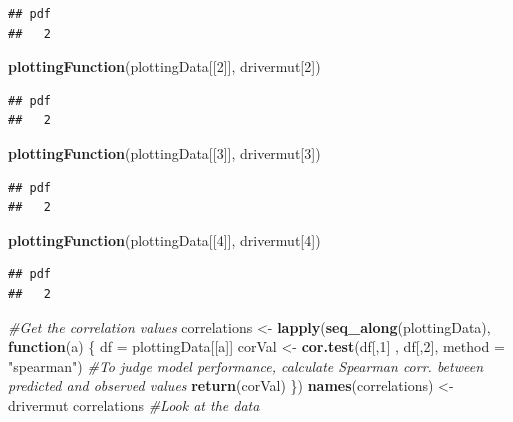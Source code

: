 \documentclass[]{article}
\newenvironment{Shaded}{\begin{snugshade}}{\end{snugshade}}
\newcommand{\CommentTok}[1]{\textcolor[rgb]{0.56,0.35,0.01}{\textit{#1}}}
\newcommand{\ControlFlowTok}[1]{\textcolor[rgb]{0.13,0.29,0.53}{\textbf{#1}}}
\newcommand{\DataTypeTok}[1]{\textcolor[rgb]{0.13,0.29,0.53}{#1}}
\newcommand{\DecValTok}[1]{\textcolor[rgb]{0.00,0.00,0.81}{#1}}
\newcommand{\KeywordTok}[1]{\textcolor[rgb]{0.13,0.29,0.53}{\textbf{#1}}}
\newcommand{\NormalTok}[1]{#1}
\newcommand{\StringTok}[1]{\textcolor[rgb]{0.31,0.60,0.02}{#1}}
\begin{document}
\begin{verbatim}
## pdf 
##   2
\end{verbatim}

\begin{Shaded}
\begin{Highlighting}[]
\KeywordTok{plottingFunction}\NormalTok{(plottingData[[}\DecValTok{2}\NormalTok{]], drivermut[}\DecValTok{2}\NormalTok{])}
\end{Highlighting}
\end{Shaded}

\begin{verbatim}
## pdf 
##   2
\end{verbatim}

\begin{Shaded}
\begin{Highlighting}[]
\KeywordTok{plottingFunction}\NormalTok{(plottingData[[}\DecValTok{3}\NormalTok{]], drivermut[}\DecValTok{3}\NormalTok{])}
\end{Highlighting}
\end{Shaded}

\begin{verbatim}
## pdf 
##   2
\end{verbatim}

\begin{Shaded}
\begin{Highlighting}[]
\KeywordTok{plottingFunction}\NormalTok{(plottingData[[}\DecValTok{4}\NormalTok{]], drivermut[}\DecValTok{4}\NormalTok{])}
\end{Highlighting}
\end{Shaded}

\begin{verbatim}
## pdf 
##   2
\end{verbatim}

\begin{Shaded}
\begin{Highlighting}[]
\CommentTok{#Get the correlation values}
\NormalTok{correlations <-}\StringTok{ }\KeywordTok{lapply}\NormalTok{(}\KeywordTok{seq_along}\NormalTok{(plottingData), }\ControlFlowTok{function}\NormalTok{(a) \{}
\NormalTok{  df =}\StringTok{ }\NormalTok{plottingData[[a]]}
\NormalTok{  corVal <-}\StringTok{ }\KeywordTok{cor.test}\NormalTok{(df[,}\DecValTok{1}\NormalTok{] , df[,}\DecValTok{2}\NormalTok{], }\DataTypeTok{method =} \StringTok{"spearman"}\NormalTok{) }\CommentTok{#To judge model performance, calculate Spearman corr. between predicted and observed values}
  \KeywordTok{return}\NormalTok{(corVal)}
\NormalTok{\})}
\KeywordTok{names}\NormalTok{(correlations) <-}\StringTok{ }\NormalTok{drivermut}
\NormalTok{correlations }\CommentTok{#Look at the data}
\end{Highlighting}
\end{Shaded}
\end{document}
